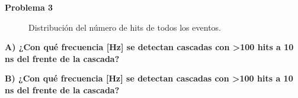 \documentclass[11pt]{article}
\begin{document}
\textbf{Problema 3}
\begin{figure}[H]
\centering


\caption{Distribución del número de hits de todos los eventos.}
\end{figure}

\textbf{A) ¿Con qué frecuencia [Hz] se detectan cascadas con >100 hits a 10 ns del frente de la cascada?}

\textbf{B) ¿Con qué frecuencia [Hz] se detectan cascadas con >100 hits a 10 ns del frente de la cascada?}
\pagebreak
\end{document}
